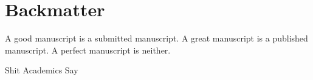 \documentclass[]{dissertation}
\begin{document}
\printbibliography[title={\color{thumb\arabic{thumbcounter}}References}]











\cleardoublepage




\setcounter{colorcounter}{6}
\part[Backmatter]{Backmatter}
\label{part:backmatter}


\epigraph{
       A good manuscript is a submitted manuscript. A great manuscript is a published manuscript. A perfect manuscript is neither.
}{Shit Academics Say} %

\chaptoc







\thumbfalse












% 

\end{document}
